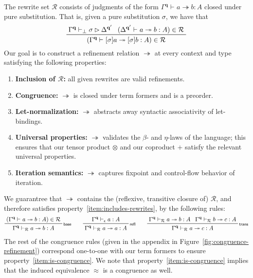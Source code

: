 \documentclass[acmsmall,screen,review]{acmart}
\newcommand{\mc}[1]{\ensuremath{\mathcal{#1}}}
\newcommand{\mb}[1]{\ensuremath{\mathbf{#1}}}
\newcommand{\rle}[1]{{\scriptsize\textsf{#1}}}
\newcommand{\hasty}[4]{#1 \vdash_{#2} #3: {#4}}
\newcommand{\issubst}[4]{#1 \vdash_{#2} #3 \rhd #4}
\newcommand{\tref}{\twoheadrightarrow}
\newcommand{\tmle}[5]{#1 \vdash_{#2} #3 \tref #4 : {#5}}
\begin{document}
The rewrite set $\mc{R}$ consists of judgments of the form $\tmle{\Gamma^{\mb{q}}}{}{a}{b}{A}$
closed under pure substitution. That is, given a pure substitution $\sigma$, we have that
\begin{equation*}
  \prftree[r]{}
    {\issubst{\Gamma^{\mb{q}}}{\bot}{\sigma}{\Delta^{\mb{q}'}}}
    {(\tmle{\Delta^{\mb{q}'}}{}{a}{b}{A}) \in \mc{R}}
    {(\tmle{\Gamma^{\mb{q}}}{}{[\sigma]a}{[\sigma]b}{A}) \in \mc{R}} 
\end{equation*}
Our goal is to construct a refinement relation $\tref$ at every context and type satisfying the
following properties: 
\begin{enumerate}
  \item \textbf{Inclusion of $\mc{R}$:} all given rewrites are valid refinements.
  \label{item:includes-rewrites}
  \item \textbf{Congruence:} $\tref$ is closed under term formers and is a preorder.
  \label{item:is-congruence}
  \item \textbf{Let-normalization:} $\tref$ abstracts away syntactic associativity of let-bindings.
  \label{item:abstracts-syntax}
  \item \textbf{Universal properties:} $\tref$ validates the $\beta$- and $\eta$-laws of the
  language; this ensures that our tensor product $\otimes$ and our coproduct $+$ satisfy the
  relevant universal properties.
  \label{item:does-computation}
  \item \textbf{Iteration semantics:} $\tref$ captures fixpoint and control-flow behavior of
  iteration.
  \label{item:does-iteration}
\end{enumerate}
We guarantree that $\tref$ contains the (reflexive, transitive closure of) $\mc{R}$, and therefore
satisfies property~\ref{item:includes-rewrites}, by the following rules:
\begin{gather*}
  \prftree[r]{\rle{base}}
    {(\tmle{\Gamma^{\mb{q}}}{}{a}{b}{A}) \in \mc{R}}
    {\tmle{\Gamma^{\mb{q}}}{\mc{R}}{a}{b}{A}} \qquad
  \prftree[r]{\rle{refl}}
    {\hasty{\Gamma^{\mb{q}}}{\epsilon}{a}{A}}
    {\tmle{\Gamma^{\mb{q}}}{\mc{R}}{a}{a}{A}}
  \qquad
  \prftree[r]{\rle{trans}}
    {\tmle{\Gamma^{\mb{q}}}{\mc{R}}{a}{b}{A}}
    {\tmle{\Gamma^{\mb{q}}}{\mc{R}}{b}{c}{A}}
    {\tmle{\Gamma^{\mb{q}}}{\mc{R}}{a}{c}{A}}
\end{gather*}
The rest of the congruence rules (given in the appendix in Figure~\ref{fig:congruence-refinement})
correspond one-to-one with our term formers to ensure property~\ref{item:is-congruence}. We note
that property~\ref{item:is-congruence} implies that the induced equivalence $\approx$ is a
congruence as well.
\end{document}
